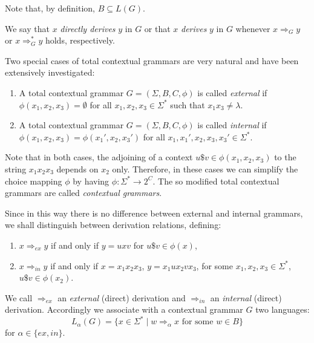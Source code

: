 Note that, by definition, $B \subseteq L(G)$.

We say that $x$ \emph{directly derives} $y$ in $G$ or that $x$ \emph{derives} $y$ in $G$ whenever $x \Rightarrow_G y$ or $x \Rightarrow^*_G y$ holds, respectively.

Two special cases of total contextual grammars are very natural and have been extensively investigated:

\begin{enumerate}
\item A total contextual grammar $G = (\Sigma, B, C, \phi)$ is called \emph{external} if $\phi(x_1, x_2, x_3) = \emptyset$ for all $x_1, x_2, x_3 \in \Sigma^*$ such that $x_1 x_3 \neq \lambda$.
\item A total contextual grammar $G = (\Sigma, B, C, \phi)$ is called \emph{internal} if $\phi(x_1, x_2, x_3) = \phi(x_1', x_2, x_3')$ for all $x_1, x_1', x_2, x_3, x_3' \in \Sigma^*$.
\end{enumerate}

Note that in both cases, the adjoining of a context $u \$ v \in \phi(x_1, x_2, x_3)$ to the string $x_1 x_2 x_3$ depends on $x_2$ only. Therefore, in these cases we can simplify the choice mapping $\phi$ by having $\phi: \Sigma^* \to 2^C$. The so modified total contextual grammars are called \emph{contextual grammars}.

Since in this way there is no difference between external and internal grammars, we shall distinguish between derivation relations, defining:

\begin{enumerate}
\item $x \Rightarrow_{ex} y$ if and only if $y = u x v$ for $u \$ v \in \phi(x)$,
\item $x \Rightarrow_{in} y$ if and only if $x = x_1 x_2 x_3$, $y = x_1 u x_2 v x_3$, for some $x_1, x_2, x_3 \in \Sigma^*$, $u \$ v \in \phi(x_2)$.
\end{enumerate}

We call $\Rightarrow_{ex}$ an \emph{external} (direct) derivation and $\Rightarrow_{in}$ an \emph{internal} (direct) derivation. Accordingly we associate with a contextual grammar $G$ two languages:
$$L_{\alpha}(G) = \{x \in \Sigma^* \mid w \Rightarrow_{\alpha} x \text{ for some } w \in B\}$$
for $\alpha \in \{ex, in\}$.

